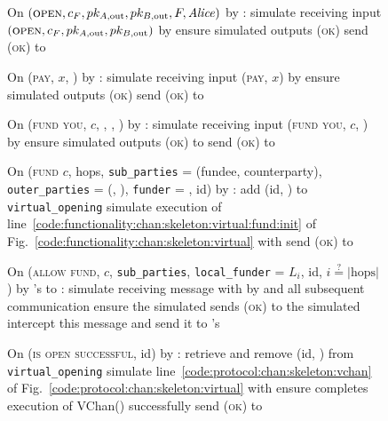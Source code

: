 \begin{figure}[H]
  \begin{simulatorbox}{\simulator}
    \begin{algorithmic}[1]
      \State On $(\textsc{open}, c_F, pk_{A, \mathrm{out}}, pk_{B,
      \mathrm{out}}, F, \mathit{Alice})$ by \fchan:
      \Indent
        \State simulate \alice receiving input $(\textsc{open}, c_F, pk_{A,
        \mathrm{out}}, pk_{B, \mathrm{out}})$ by \environment
        \State ensure simulated \alice outputs (\textsc{ok})
        \State send (\textsc{ok}) to \fchan
      \EndIndent
      \Statex

      \State On (\textsc{pay}, $x$, \dave) by \fchan:
      \Indent
        \State simulate \dave receiving input (\textsc{pay}, $x$) by \environment
        \State ensure simulated \dave outputs (\textsc{ok})
        \State send (\textsc{ok}) to \fchan
      \EndIndent
      \Statex

      \State On (\textsc{fund you}, $c$, \bob, \charlie, \alice) by \fchan:
      \Indent
        \State simulate \alice receiving input (\textsc{fund you}, $c$, \bob) by
        \charlie
        \State ensure simulated \alice outputs (\textsc{ok}) to \charlie
        \State send (\textsc{ok}) to \fchan
      \EndIndent
      \Statex

      \State On (\textsc{fund} $c$, hops, \texttt{sub\_parties} = (fundee,
      counterparty), \texttt{outer\_parties} = (\charlie, \dave),
      \texttt{funder} = \alice, id) by \fchan:
      \Indent
        \State add (id, \alice) to \texttt{virtual\_opening}
        \State simulate execution of
        line~\ref{code:functionality:chan:skeleton:virtual:fund:init} of
        Fig.~\ref{code:functionality:chan:skeleton:virtual} with \alice
        \State send (\textsc{ok}) to \fchan
      \EndIndent
      \Statex

      \State On (\textsc{allow fund}, $c$, \texttt{sub\_parties},
      \texttt{local\_funder} = $L_i$, id, $i \overset{?}{=} |\mathrm{hops}|$) by
      \fchan's \alice to \charlie:
      \Indent
        \State simulate receiving message with \charlie by \alice and all
        subsequent communication
        \State ensure the simulated \charlie sends (\textsc{ok}) to the
        simulated \alice
        \State intercept this message and send it to \fchan's \alice
      \EndIndent
      \Statex

      \State On (\textsc{is open successful}, id) by \fchan:
      \Indent
        \State retrieve and remove (id, \alice) from \texttt{virtual\_opening}
        \State simulate line~\ref{code:protocol:chan:skeleton:vchan} of
        Fig.~\ref{code:protocol:chan:skeleton:virtual} with \alice
        \State ensure \alice completes execution of VChan() successfully
        \State send (\textsc{ok}) to \fchan
      \EndIndent
      \Statex


\end{algorithmic}
\end{simulatorbox}
\end{figure}
